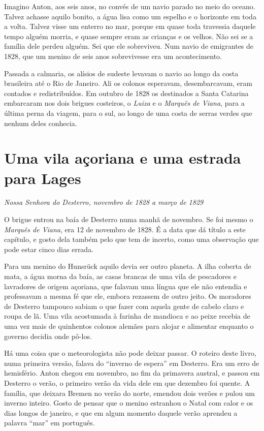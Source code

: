 \documentclass[
  brazilian,
  11pt,
  openany]{book}
\begin{document}
Imagino Anton, aos seis anos, no convés de um navio parado no meio do
oceano. Talvez achasse aquilo bonito, a água lisa como um espelho e o
horizonte em toda a volta. Talvez visse um enterro no mar, porque em
quase toda travessia daquele tempo alguém morria, e quase sempre eram as
crianças e os velhos. Não sei se a família dele perdeu alguém. Sei que
ele sobreviveu. Num navio de emigrantes de 1828, que um menino de seis
anos sobrevivesse era um acontecimento.

Passada a calmaria, os alísios de sudeste levavam o navio ao longo da
costa brasileira até o Rio de Janeiro. Ali os colonos esperavam,
desembarcavam, eram contados e redistribuídos. Em outubro de 1828 os
destinados a Santa Catarina embarcaram nos dois brigues costeiros, o
\emph{Luiza} e o \emph{Marquês de Viana}, para a última perna da viagem,
para o sul, ao longo de uma costa de serras verdes que nenhum deles
conhecia.

\section{Uma vila açoriana e uma estrada para
Lages}\label{uma-vila-auxe7oriana-e-uma-estrada-para-lages}

\emph{Nossa Senhora do Desterro, novembro de 1828 a março de 1829}

O brigue entrou na baía de Desterro numa manhã de novembro. Se foi mesmo
o \emph{Marquês de Viana}, era 12 de novembro de 1828. É a data que dá
título a este capítulo, e gosto dela também pelo que tem de incerto,
como uma observação que pode estar cinco dias errada.

Para um menino do Hunsrück aquilo devia ser outro planeta. A ilha
coberta de mata, a água morna da baía, as casas brancas de uma vila de
pescadores e lavradores de origem açoriana, que falavam uma língua que
ele não entendia e professavam a mesma fé que ele, embora rezassem de
outro jeito. Os moradores de Desterro tampouco sabiam o que fazer com
aquela gente de cabelo claro e roupa de lã. Uma vila acostumada à
farinha de mandioca e ao peixe recebia de uma vez mais de quinhentos
colonos alemães para alojar e alimentar enquanto o governo decidia onde
pô-los.

Há uma coisa que o meteorologista não pode deixar passar. O roteiro
deste livro, numa primeira versão, falava do ``inverno de espera'' em
Desterro. Era um erro de hemisfério. Anton chegou em novembro, no fim da
primavera austral, e passou em Desterro o verão, o primeiro verão da
vida dele em que dezembro foi quente. A família, que deixara Bremen no
verão do norte, emendou dois verões e pulou um inverno inteiro. Gosto de
pensar que o menino estranhou o Natal com calor e os dias longos de
janeiro, e que em algum momento daquele verão aprendeu a palavra ``mar''
em português.
\end{document}
